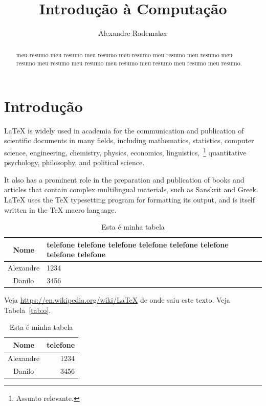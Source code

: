 \documentclass[a4page,12pt]{article}
\begin{document}
\title{Introdução à Computação}
\author{Alexandre Rademaker}
\date{}
\maketitle

\begin{abstract}
  meu resumo meu resumo meu resumo meu resumo meu resumo meu resumo meu resumo meu resumo meu resumo meu resumo meu resumo meu resumo meu resumo.
\end{abstract}

\section{Introdução}
\label{sec:intro}

\LaTeX{} is widely used in academia     for the communication and
publication of scientific documents in many fields, including
mathematics, statistics, computer science, engineering, chemistry,
physics, economics, linguistics,~\footnote{Assunto relevante.}
quantitative psychology, philosophy, and political science.

It also has a prominent role in the preparation and publication of books and articles that contain complex multilingual materials, such as Sanskrit and Greek. LaTeX uses the TeX typesetting program for formatting its output, and is itself written in the \TeX{} macro language.

\begin{table}[htbp]
  \begin{center}
  \begin{tabularx}{10cm}{cX} \hline
         Nome & telefone telefone telefone telefone telefone telefone telefone telefone  \\ \hline
    Alexandre & 1234 \\
       Danilo & 3456 \\ \hline
  \end{tabularx}
  \caption{Esta é minha tabela}\label{tab:o1}
  \end{center}
\end{table}


Veja \url{https://en.wikipedia.org/wiki/LaTeX} de onde saiu este texto. Veja Tabela~\ref{tab:o}.

\begin{table}[htbp]
  \begin{center}
  \begin{tabular}{cr} \hline
         Nome & telefone \\ \hline
    Alexandre & 1234 \\
       Danilo & 3456 \\ \hline
  \end{tabular}
  \caption{Esta é minha tabela}\label{tab:ow}
  \end{center}
\end{table}
\end{document}
